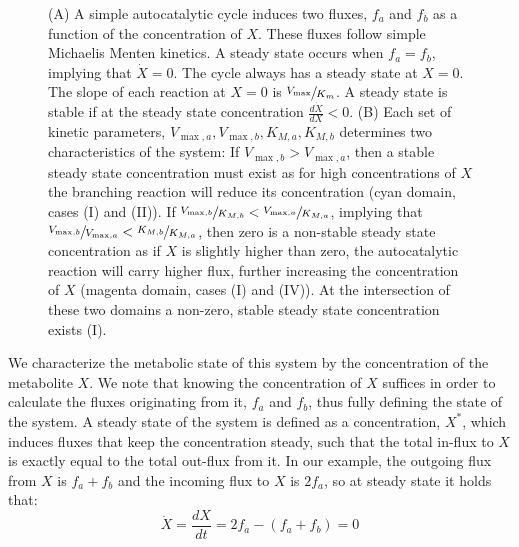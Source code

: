 \begin{figure}[h!]
      \caption{\label{fig:simplecycle}
        (A) A simple autocatalytic cycle induces two fluxes, $f_a$ and $f_b$ as a function of the concentration of $X$.
        These fluxes follow simple Michaelis Menten kinetics.
        A steady state occurs when $f_a=f_b$, implying that $\dot{X}=0$.
        The cycle always has a steady state at $X=0$.
        The slope of each reaction at $X=0$ is $\sfrac{V_{\max}}{K_m}$.
        A steady state is stable if at the steady state concentration $\frac{d\dot{X}}{dX}<0$.
        (B) Each set of kinetic parameters, $V_{\max,a},V_{\max,b},K_{M,a},K_{M,b}$ determines two characteristics of the system: 
        If $V_{\max,b}>V_{\max,a}$, then a stable steady state concentration must exist as for high concentrations of $X$ the branching reaction will reduce its concentration (cyan domain, cases (I) and (II)).
        If $\sfrac{V_{\max,b}}{K_{M,b}}<\sfrac{V_{\max,a}}{K_{M,a}}$, implying that $\sfrac{V_{\max,b}}{V_{\max,a}}<\sfrac{K_{M,b}}{K_{M,a}}$, then zero is a non-stable steady state concentration as if $X$ is slightly higher than zero, the autocatalytic reaction will carry higher flux, further increasing the concentration of $X$ (magenta domain, cases (I) and (IV)).
    At the intersection of these two domains a non-zero, stable steady state concentration exists (I).}
    \end{figure}

    We characterize the metabolic state of this system by the concentration of the metabolite $X$.
    We note that knowing the concentration of $X$ suffices in order to calculate the fluxes originating from it, $f_a$ and $f_b$, thus fully defining the state of the system.
    A steady state of the system is defined as a concentration, $X^*$, which induces fluxes that keep the concentration steady, such that the total in-flux to $X$ is exactly equal to the total out-flux from it.
    In our example, the outgoing flux from $X$ is $f_a+f_b$ and the incoming flux to $X$ is $2f_a$, so at steady state it holds that:
    \begin{equation}
      \label{eq:xdyna}
      \dot X = \frac{dX}{dt} = 2f_a - (f_a + f_b) = 0
    \end{equation}

